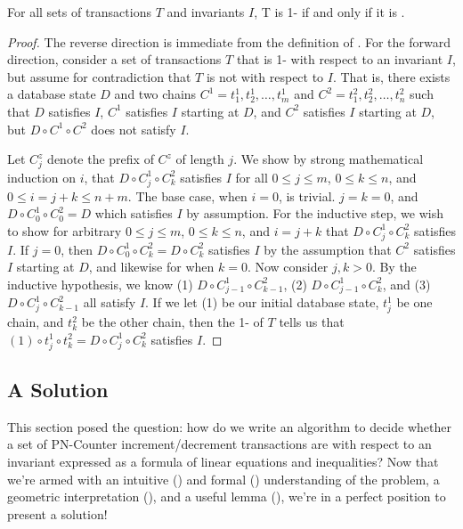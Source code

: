\begin{theorem}\label{thm:one-is-enough}
  For all sets of transactions $T$ and invariants $I$, T is 1-\iconfluent{} if
  and only if it is \iconfluent{}.
\end{theorem}
\begin{proof}
  The reverse direction is immediate from the definition of \iconfluence{}. For
  the forward direction, consider a set of transactions $T$ that is
  1-\iconfluent{} with respect to an invariant $I$, but assume for
  contradiction that $T$ is not \iconfluent{} with respect to $I$. That is,
  there exists a database state $D$ and two chains $C^1 = t^1_1, t^1_2, \ldots,
  t^1_m$ and $C^2 = t^2_1, t^2_2, \ldots, t^2_n$ such that $D$ satisfies $I$,
  $C^1$ satisfies $I$ starting at $D$, and $C^2$ satisfies $I$ starting at $D$,
  but $D \circ C^1 \circ C^2$ does not satisfy $I$.

  Let $C^z_j$ denote the prefix of $C^z$ of length $j$. We show by strong
  mathematical induction on $i$, that $D \circ C^1_j \circ C^2_k$ satisfies $I$
  for all $0 \leq j \leq m$, $0 \leq k \leq n$, and $0 \leq i = j + k \leq n +
  m$.
  The base case, when $i = 0$, is trivial. $j = k = 0$, and $D \circ C^1_0
  \circ C^2_0 = D$ which satisfies $I$ by assumption.
  For the inductive step, we wish to show for arbitrary $0 \leq j \leq m$, $0
  \leq k \leq n$, and $i = j + k$ that $D \circ C^1_j \circ C^2_k$ satisfies
  $I$. If $j = 0$, then $D \circ C^1_0 \circ C^2_k = D \circ C^2_k$ satisfies
  $I$ by the assumption that $C^2$ satisfies $I$ starting at $D$, and likewise
  for when $k = 0$. Now consider $j, k > 0$. By the inductive hypothesis, we
  know
    (1) $D \circ C^1_{j-1} \circ C^2_{k-1}$,
    (2) $D \circ C^1_{j-1} \circ C^2_{k}$, and
    (3) $D \circ C^1_{j}   \circ C^2_{k-1}$
  all satisfy $I$. If we let (1) be our initial database state, $t^1_j$ be one
  chain, and $t^2_k$ be the other chain, then the 1-\iconfluence{} of $T$ tells
  us that $(1) \circ t^1_j \circ t^2_k = D \circ C^1_j \circ C^2_k$ satisfies
  $I$.
\end{proof}

\subsection{A Solution}\label{sec:solution}
This section posed the question: how do we write an algorithm to decide whether
a set of PN-Counter increment/decrement transactions are \iconfluent{} with
respect to an invariant expressed as a formula of linear equations and
inequalities?  Now that we're armed with an intuitive
() and formal ()
understanding of the problem, a geometric interpretation
(), and a useful lemma (), we're
in a perfect position to present a solution!


